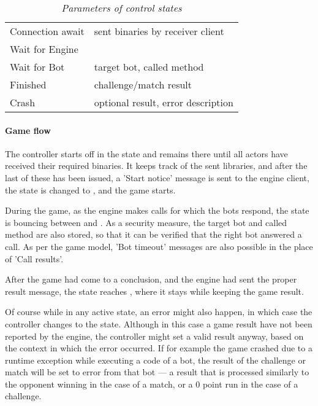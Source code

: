 		\begin{table}[h]
			\centering
			\setlength{\tabcolsep}{8pt}
			\renewcommand{\arraystretch}{1.5}
			\begin{tabularx}{0.8\linewidth}{
				|>{\hsize=0.7\hsize}X|%
				>{\hsize1.3\hsize}X|%
			  }
				\hline
				 \multicolumn{1}{|c|}{\textbf{Control state}} &%
				 \multicolumn{1}{c|}{\textbf{Parameters}} \\ \hline
				
				Connection await & sent binaries by receiver client \\ \hline
				Wait for Engine & \emptycell \\ \hline
				Wait for Bot & target bot, called method \\ \hline
				Finished & challenge/match result \\ \hline
				Crash & optional result, error description \\ \hline
			\end{tabularx}
			\caption*{\emph{Parameters of control states}}
		\end{table}

			\paragraph{Game flow}
			
			The controller starts off in the  state and remains there until all actors have received their required binaries. It keeps track of the sent libraries, and after the last of these has been issued, a 'Start notice' message is sent to the engine client, the state is changed to , and the game starts.
			
			During the game, as the engine makes calls for which the bots respond, the state is bouncing between  and . As a security measure, the target bot and called method are also stored, so that it can be verified that the right bot answered a call. As per the game model, 'Bot timeout' messages are also possible in the place of 'Call results'.
			
			After the game had come to a conclusion, and the engine had sent the proper result message, the state reaches , where it stays while keeping the game result.
			
			Of course while in any active state, an error might also happen, in which case the controller changes to the  state. Although in this case a game result have not been reported by the engine, the controller might set a valid result anyway, based on the context in which the error occurred. If for example the game crashed due to a runtime exception while executing a code of a bot, the result of the challenge or match will be set to error from that bot --- a result that is processed similarly to the opponent winning in the case of a match, or a 0 point run in the case of a challenge.

